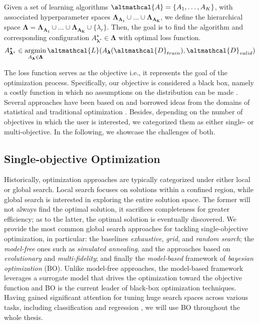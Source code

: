 \begin{definition}
    Given a set of learning algorithms $\altmathcal{A} = \{A_1, \dots, A_K\}$, with assocciated hyperparameter spaces  $\pmb{\Lambda_{A_1}} \cup \dots \cup \pmb{\Lambda_{A_K}}$, we define the hierarchical space $\pmb{\Lambda} = \pmb{\Lambda_{A_1}} \cup \dots \cup \pmb{\Lambda_{A_K}} \cup \{\lambda_r\}$. Then, the goal is to find the algorithm and corresponding configuration $A^{\star}_{\pmb{\lambda}^{\star}} \in \pmb{\Lambda}$ with optimal loss function.
    \begin{equation*}
        A^{\star}_{\pmb{\lambda}^{\star}} \in \argmin_{A_{\pmb{\lambda}} \in \pmb{\Lambda}} \altmathcal{L}(A_{\pmb{\lambda}}(\altmathcal{D}_{train}), \altmathcal{D}_{valid})
    \end{equation*}
\end{definition}

The loss function serves as the objective i.e., it represents the goal of the optimization process.
Specifically, our objective is considered a black box, namely a costly function in which no assumptions on the distribution can be made \cite{69, 134, 88, 55}.
Several approaches have been based on and borrowed ideas from the domains of statistical and traditional optimization \cite{opt_algos}.
Besides, depending on the number of objectives in which the user is interested, we categorized them as either single- or multi-objective.
In the following, we showcase the challenges of both.

\subsection{Single-objective Optimization}

Historically, optimization approaches are typically categorized under either local or global search.
Local search focuses on solutions within a confined region, while global search is interested in exploring the entire solution space.
The former will not always find the optimal solution, it sacrifices completeness for greater efficiency; as to the latter, the optimal solution is eventually discovered.
We provide the most common global search approaches for tackling single-objective optimization, in particular: the baselines \textit{exhaustive}, \textit{grid}, and \textit{random search};  the \textit{model-free} ones such as \textit{simulated annealing}, and the approaches based on \textit{evolutionary} and \textit{multi-fidelity}; and finally the \textit{model-based} framework of \textit{bayesian optimization} (BO).
Unlike model-free approaches, the model-based framework leverages a surrogate model that drives the optimization toward the objective function and BO is the current leader of black-box optimization techniques.
Having gained significant attention for tuning huge search spaces across various tasks, including classification and regression \cite{113, 112}, we will use BO throughout the whole thesis.

